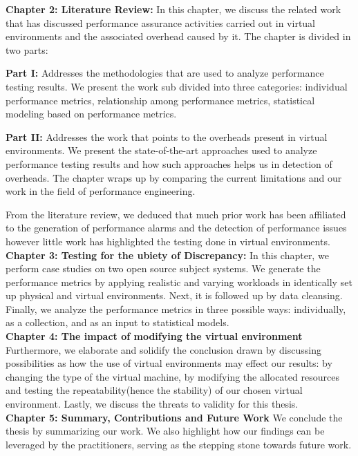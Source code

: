 \textbf{Chapter 2: Literature Review:} In this chapter, we discuss the related work that has discussed performance assurance activities carried out in virtual environments and the associated overhead caused by it. The chapter is divided in two parts:

	\textbf{Part I:} Addresses the methodologies that are used to analyze performance testing results. We present the work sub divided into three categories: individual performance metrics, relationship among performance metrics, statistical modeling based on performance metrics.   
	
    \textbf{Part II:} Addresses the work that points to the overheads present in virtual environments. We present the state-of-the-art approaches used to analyze performance testing results and how such approaches helps us in detection of overheads. The chapter wraps up by comparing the current limitations and our work in the field of performance engineering.

From the literature review, we deduced that much prior work has been affiliated to the generation of performance alarms and the detection of performance issues however little work has highlighted the testing done in virtual environments.
\\

\noindent\textbf{Chapter 3: Testing for the ubiety of Discrepancy:} In this chapter, we perform case studies on two open source subject systems. We generate the performance metrics by applying realistic and varying workloads in identically set up physical and virtual environments. Next, it is followed up by data cleansing. Finally, we analyze the performance metrics in three possible ways: individually, as a collection, and as an input to statistical models. 
\\

\noindent\textbf{Chapter 4: The impact of modifying the virtual environment}
Furthermore, we elaborate and solidify the conclusion drawn by discussing possibilities as how the use of virtual environments may effect our results: by changing the type of the virtual machine, by modifying the allocated resources and testing the repeatability(hence the stability) of our chosen virtual environment.
Lastly, we discuss the threats to validity for this thesis.
\\

\noindent\textbf{Chapter 5: Summary, Contributions and Future Work}
We conclude the thesis by summarizing our work. We also highlight how our findings can be leveraged by the practitioners, serving as the stepping stone towards future work.  
\\


